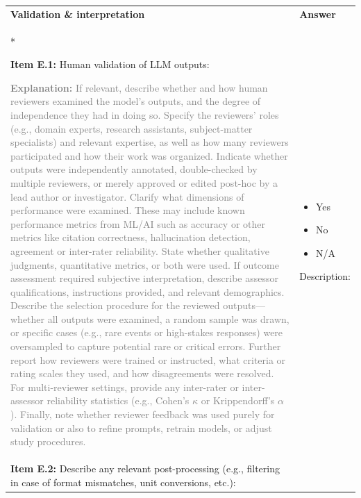 \documentclass[12pt]{article}
\newcommand{\unchecked}{\ding{111}} %
\begin{document}
\begin{longtable}{|p{}|p{}|}
\hline
\rowcolor{green!20}
\textbf{{Validation \& interpretation}} & \textbf{Answer} \\*   %
\hline

\textbf{Item E.1:} Human validation of LLM outputs:

\textcolor{gray}{{\footnotesize
\textbf{Explanation:} If relevant, describe whether and how human reviewers examined the model’s outputs, and the degree of independence they had in doing so. Specify the reviewers’ roles (e.g., domain experts, research assistants, subject-matter specialists) and relevant expertise, as well as how many reviewers participated and how their work was organized. Indicate whether outputs were independently annotated, double-checked by multiple reviewers, or merely approved or edited post-hoc by a lead author or investigator.
Clarify what dimensions of performance were examined. These may include known performance metrics from ML/AI such as accuracy or other metrics like citation correctness, hallucination detection, agreement or inter-rater reliability. State whether qualitative judgments, quantitative metrics, or both were used. If outcome assessment required subjective interpretation, describe assessor qualifications, instructions provided, and relevant demographics.
Describe the selection procedure for the reviewed outputs—whether all outputs were examined, a random sample was drawn, or specific cases (e.g., rare events or high-stakes responses) were oversampled to capture potential rare or critical errors. Further report how reviewers were trained or instructed, what criteria or rating scales they used, and how disagreements were resolved. For multi-reviewer settings, provide any inter-rater or inter-assessor reliability statistics (e.g., Cohen’s $\kappa$ or Krippendorff's $\alpha$). Finally, note whether reviewer feedback was used purely for validation or also to refine prompts, retrain models, or adjust study procedures.
}}
& 
\begin{itemize}[leftmargin=*]\setlength{\itemsep}{0pt}\setlength{\parskip}{0pt}
    \item[\unchecked] Yes
    \item[\unchecked] No
    \item[\unchecked] N/A
\end{itemize} 

Description:\\
\hline
\textbf{Item E.2:} Describe any relevant post-processing (e.g., filtering in case of format mismatches, unit conversions, etc.):


\end{longtable}
\end{document}
